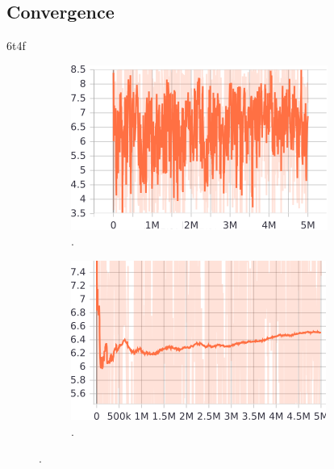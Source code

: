 \documentclass[11pt, a4paper]{article}
\begin{document}
\subsection{Convergence}
6t4f
\begin{figure}[h]
	\begin{subfigure}{0.45\textwidth}
		\centering
		\includegraphics[width=\linewidth]{reward_notSmoothed.png}  
		\caption{.}
	\end{subfigure}
	\begin{subfigure}{0.45\textwidth}
		\centering
		\includegraphics[width=\linewidth]{reward_smoothed.png}  
		\caption{.}
	\end{subfigure}
	\caption{\label{fig:reward_tb}.}
\end{figure}
\end{document}
